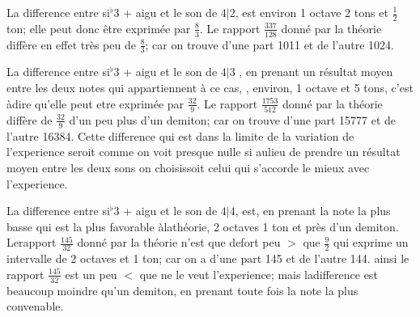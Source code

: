 \documentclass[11pt,a4paper]{article}
\begin{document}
La difference entre si$^{\flat}$3 + aigu et le son de $4|2$, est
environ 1 octave 2 tons et $\frac{1}{2}$ ton; elle peut donc être exprimée
par $\frac{8}{3}$. Le rapport $\frac{337}{128}$ donné par la théorie diffère en effet
très peu de $\frac{8}{3}$; car on trouve d'une part 1011 et de l'autre
1024.

La difference entre si$^{\flat}$3 + aigu et le son de $4|3$ , en prenant
un résultat moyen entre les deux notes qui appartiennent à ce
cas, , environ, 1 octave et 5 tons,
c'est àdire qu'elle peut etre exprimée par $\frac{32}{9}$. Le rapport
$\frac{1753}{512}$ donné par la théorie diffère de $\frac{32}{9}$ d'un peu plus
d'un demiton; car on trouve d'une part 15777 et de
l'autre 16384. Cette difference qui est dans la limite de
 la variation de l'experience seroit  comme
on voit presque nulle si aulieu de prendre un résultat
moyen entre les deux sons on choisissoit celui qui s'accorde
le mieux avec l'experience.


La difference entre si$^{\flat}$3 + aigu et le son de $4|4$, est, en prenant
la note la plus basse qui est la plus favorable àlathéorie,
2 octaves 1 ton et près d'un demiton. Lerapport $\frac{145}{32}$ donné
par la théorie n'est que defort peu $>$ que $\frac{9}{2}$ qui exprime
un intervalle de 2 octaves et 1 ton; car on a d'une part
145 et de l'autre 144. ainsi  le rapport $\frac{145}{32}$ est
un peu $<$ que ne le veut l'experience; mais ladifference est
beaucoup moindre qu'un demiton, en prenant toute fois la
note la plus convenable.
\end{document}
